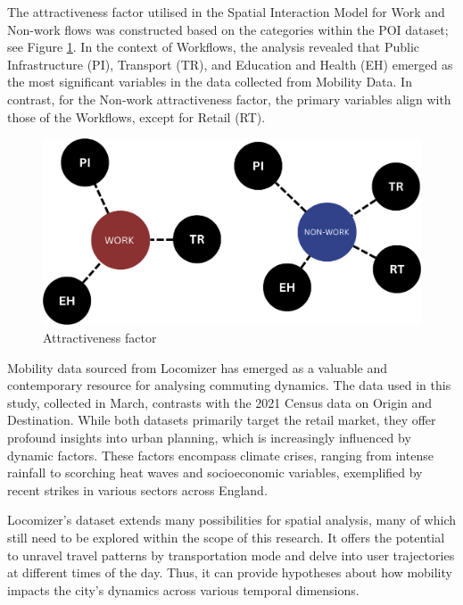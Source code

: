        The attractiveness factor utilised in the Spatial Interaction Model for Work and Non-work flows was constructed based on the categories within the POI dataset; see Figure \ref{fig: Attractiveness factor}. In the context of Workflows, the analysis revealed that Public Infrastructure (PI), Transport (TR), and Education and Health (EH) emerged as the most significant variables in the data collected from Mobility Data. In contrast, for the Non-work attractiveness factor, the primary variables align with those of the Workflows, except for Retail (RT).

        \begin{figure}[H]
            \centering
            \includegraphics[width=14cm]{Images/Atractiveness factor.png}
            \caption{Attractiveness factor}
            \label{fig: Attractiveness factor}
        \end{figure}

       Mobility data sourced from Locomizer has emerged as a valuable and contemporary resource for analysing commuting dynamics. The data used in this study, collected in March, contrasts with the 2021 Census data on Origin and Destination. While both datasets primarily target the retail market, they offer profound insights into urban planning, which is increasingly influenced by dynamic factors. These factors encompass climate crises, ranging from intense rainfall to scorching heat waves and socioeconomic variables, exemplified by recent strikes in various sectors across England.

        Locomizer's dataset extends many possibilities for spatial analysis, many of which still need to be explored within the scope of this research. It offers the potential to unravel travel patterns by transportation mode and delve into user trajectories at different times of the day. Thus, it can provide hypotheses about how mobility impacts the city's dynamics across various temporal dimensions.

